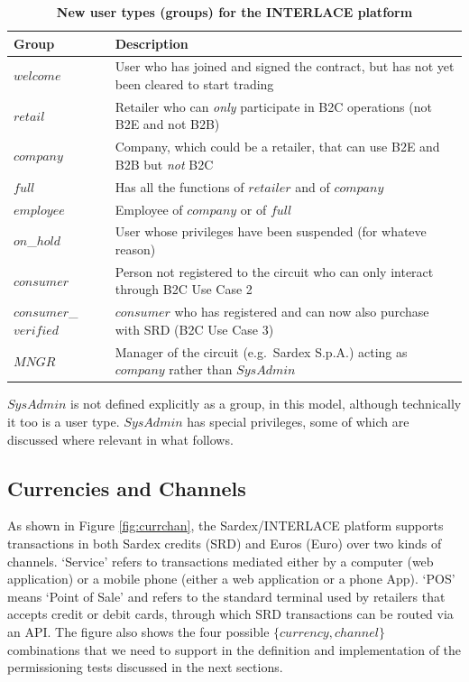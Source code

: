 \setlength{\tabcolsep}{10pt}
\begin{table}[htbp]
\begin{centering}
\small
{
\begin{tabular}{| l | l | }
\hline
\textbf{Group}	& \textbf{Description} \\
\hline
$welcome$ & User who has joined and signed the contract, but has not yet been cleared to start trading \\
\hline
$retail$ & Retailer who can \emph{only} participate in B2C operations (not B2E and not B2B) \\
\hline
$company$ & Company, which could be a retailer, that can use B2E and B2B but \emph{not} B2C \\
\hline
$full$ & Has all the functions of $retailer$ and of $company$ \\
\hline
$employee$ & Employee of $company$ or of $full$ \\
\hline
$on$\_$hold$ & User whose privileges have been suspended (for whateve reason) \\
\hline
$consumer$ & Person not registered to the circuit who can only interact through B2C Use Case 2 \\
\hline
$consumer$\_$verified$ & $consumer$ who has registered and can now also purchase with SRD (B2C Use Case 3)  \\
\hline
$MNGR$ & Manager of the circuit (e.g.\ Sardex S.p.A.) acting as $company$ rather than $SysAdmin$ \\
\hline
\end{tabular}
}
\caption{\small\textbf{New user types (groups) for the INTERLACE platform}}
\label{tab:groups}
\end{centering}
\end{table}
\vspace{-0.5cm}

$SysAdmin$ is not defined explicitly as a group, in this model, although technically it too is a user type. $SysAdmin$ has special privileges, some of which are discussed where relevant in what follows.

\subsection{Currencies and Channels}
As shown in Figure \ref{fig:currchan}, the Sardex/INTERLACE platform supports transactions in both Sardex credits (SRD) and Euros (Euro) over two kinds of channels. `Service' refers to transactions mediated either by a computer (web application) or a mobile phone (either a web application or a phone App). `POS' means `Point of Sale' and refers to the standard terminal used by retailers that accepts credit or debit cards, through which SRD transactions can be routed via an API. The figure also shows the four possible $\{ currency, channel \}$ combinations that we need to support in the definition and implementation of the permissioning tests discussed in the next sections.

